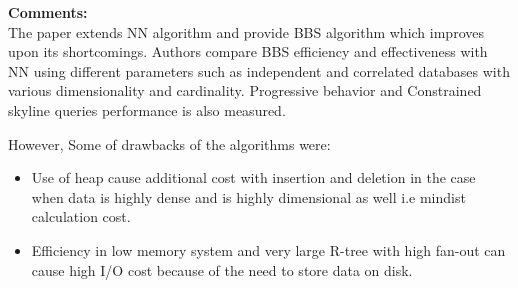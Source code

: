 \documentclass[a4paper,12pt, twoside]{article}
\begin{document}
\textbf{Comments:}\\
The paper extends NN algorithm and provide BBS algorithm which improves upon its shortcomings. Authors compare BBS efficiency and effectiveness with NN using different parameters such as independent and correlated databases with various dimensionality and cardinality. Progressive behavior and Constrained skyline queries performance is also measured.   

However, Some of drawbacks of the algorithms were:
\begin{itemize}
	\item Use of heap cause additional cost with insertion and deletion in the case when data is highly dense and is highly dimensional as well i.e mindist calculation cost.	
	\item Efficiency in low memory system and very large R-tree with high fan-out can cause high I/O cost because of the need to store data on disk.
\end{itemize}
\end{document}
